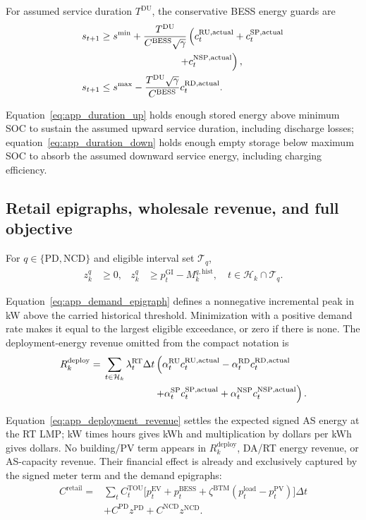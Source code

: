 \documentclass[final,5p,times]{elsarticle}
\newcommand{\dt}{\Delta t}
\newcommand{\EV}{\mathrm{EV}}
\newcommand{\BESS}{\mathrm{BESS}}
\newcommand{\RT}{\mathrm{RT}}
\newcommand{\GI}{\mathrm{GI}}
\newcommand{\PV}{\mathrm{PV}}
\newcommand{\TOU}{\mathrm{TOU}}
\newcommand{\PD}{\mathrm{PD}}
\newcommand{\NCD}{\mathrm{NCD}}
\newcommand{\RU}{\mathrm{RU}}
\newcommand{\RD}{\mathrm{RD}}
\newcommand{\SP}{\mathrm{SP}}
\newcommand{\NSP}{\mathrm{NSP}}
\newcommand{\actual}{\mathrm{actual}}
\newcommand{\hist}{\mathrm{hist}}
\newcommand{\load}{\mathrm{load}}
\newcommand{\calT}{\mathcal{T}}
\newcommand{\calH}{\mathcal{H}}
\begin{document}
For assumed service duration $T^{\mathrm{DU}}$, the conservative BESS energy
guards are
\begin{align}
s_{t+1}&\ge s^{\min}
+\frac{T^{\mathrm{DU}}}{C^{\BESS}\sqrt{\gamma}}
\left(c_t^{\RU,\actual}+c_t^{\SP,\actual}\right.\nonumber\\
&\hspace{28mm}\left.+c_t^{\NSP,\actual}\right),
\label{eq:app_duration_up}\\
s_{t+1}&\le s^{\max}
-\frac{T^{\mathrm{DU}}\sqrt{\gamma}}{C^{\BESS}}c_t^{\RD,\actual}.
\label{eq:app_duration_down}
\end{align}

Equation~\eqref{eq:app_duration_up} holds enough stored energy above minimum SOC to sustain the assumed upward service duration, including discharge losses; equation~\eqref{eq:app_duration_down} holds enough empty storage below maximum SOC to absorb the assumed downward service energy, including charging efficiency.

\subsection{Retail epigraphs, wholesale revenue, and full objective}
For $q\in\{\PD,\NCD\}$ and eligible interval set $\calT_q$,
\begin{align}
z_k^q&\ge0,&
z_k^q&\ge p_t^{\GI}-M_k^{q,\hist},\quad
t\in\calH_k\cap\calT_q. \label{eq:app_demand_epigraph}
\end{align}

Equation~\eqref{eq:app_demand_epigraph} defines a nonnegative incremental peak in kW above the carried historical threshold. Minimization with a positive demand rate makes it equal to the largest eligible exceedance, or zero if there is none.
The deployment-energy revenue omitted from the compact notation is
\begin{align}
R_k^{\mathrm{deploy}}
={}&\sum_{t\in\calH_k}\lambda_t^{\RT}\dt
\left(\alpha_t^{\RU}c_t^{\RU,\actual}
-\alpha_t^{\RD}c_t^{\RD,\actual}\right.\nonumber\\
&\left.\hspace{18mm}+\alpha_t^{\SP}c_t^{\SP,\actual}
+\alpha_t^{\NSP}c_t^{\NSP,\actual}\right). \label{eq:app_deployment_revenue}
\end{align}

Equation~\eqref{eq:app_deployment_revenue} settles the expected signed AS energy at the RT LMP; kW times hours gives kWh and multiplication by dollars per kWh gives dollars.
No building/PV term appears in $R_k^{\mathrm{deploy}}$, DA/RT energy revenue,
or AS-capacity revenue. Their financial effect is already and exclusively
captured by the signed meter term and the demand epigraphs:
\begin{align}
C^{\mathrm{retail}}
={}&\sum_t C_t^{\TOU}
\bigl[p_t^{\EV}+p_t^{\BESS}
+\zeta^{\mathrm{BTM}}(p_t^{\load}-p_t^{\PV})\bigr]\dt\nonumber\\
&+C^{\PD}z^{\PD}+C^{\NCD}z^{\NCD}.
\label{eq:app_passive_retail_effect}
\end{align}
\end{document}

